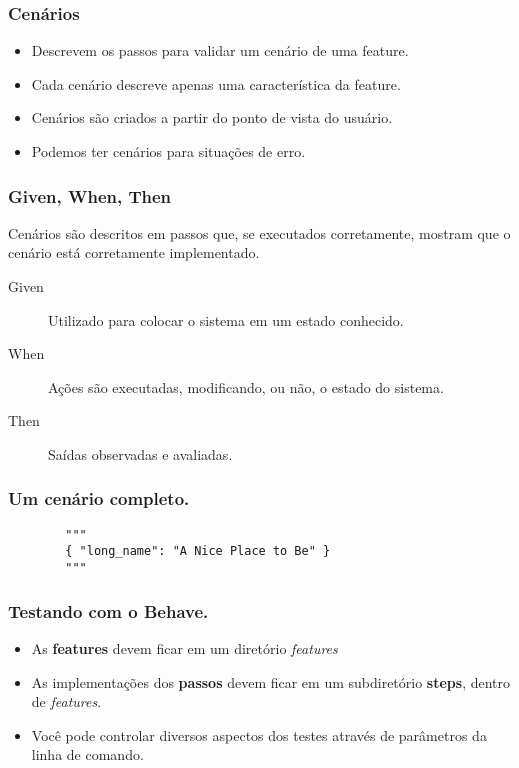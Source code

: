 \begin{frame}
    \frametitle{Cenários}
    \begin{itemize}
        \item Descrevem os passos para validar um cenário de uma feature.
        \item Cada cenário descreve apenas uma característica da feature.
        \item Cenários são criados a partir do ponto de vista do usuário.
        \item Podemos ter cenários para situações de erro.
    \end{itemize}
\end{frame}

\begin{frame}
    \frametitle{Given, When, Then}
    \vfill
    Cenários são descritos em passos que, se executados corretamente, mostram que
    o cenário está corretamente implementado.
    \vfill
    \begin{description}
        \item[Given]{Utilizado para colocar o sistema em um estado conhecido.}
        \item[When]{Ações são executadas, modificando, ou não, o estado do sistema.}
        \item[Then]{Saídas observadas e avaliadas.}
    \end{description}
\end{frame}

\begin{frame}[fragile]
    \frametitle{Um cenário completo.}

    {\color{magenta}
    \begin{verbatim}
        """
        { "long_name": "A Nice Place to Be" }
        """\end{verbatim}}
\end{frame}

\begin{frame}
    \frametitle{Testando com o Behave.}
    \begin{itemize}
        \item As \textbf{features} devem ficar em um diretório \textit{features}
        \item As implementações dos \textbf{passos} devem ficar em um subdiretório
        \textbf{steps}, dentro de \textit{features}.
        \item Você pode controlar diversos aspectos dos testes através de 
        parâmetros da linha de comando.
    \end{itemize}
\end{frame}

